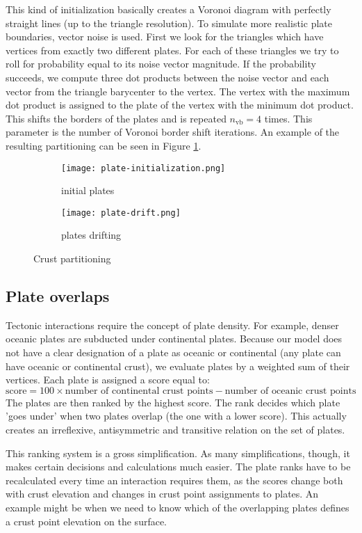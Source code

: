 This kind of initialization basically creates a Voronoi diagram with perfectly straight lines (up to the triangle resolution). To simulate more realistic plate boundaries, vector noise is used. First we look for the triangles which have vertices from exactly two different plates. For each of these triangles we try to roll for probability equal to its noise vector magnitude. If the probability succeeds, we compute three dot products between the noise vector and each vector from the triangle barycenter to the vertex. The vertex with the maximum dot product is assigned to the plate of the vertex with the minimum dot product. This shifts the borders of the plates and is repeated $n_{\mbox{vb}}=4$ times. This parameter is the number of Voronoi border shift iterations. An example of the resulting partitioning can be seen in Figure \ref{fig:initial-plates}.
\begin{figure}[ht]
\centering
\begin{subfigure}{7cm}
\texttt{[image: plate-initialization.png]}
\caption{initial plates}
\label{fig:initial-plates}
\end{subfigure}
\hspace*{1cm}
\begin{subfigure}{7cm}
\texttt{[image: plate-drift.png]}
\caption{plates drifting}
\label{fig:plates-drifting}
\end{subfigure}
\caption{Crust partitioning}
\label{fig:crust-partitioning}
\end{figure}
\subsection{Plate overlaps}
Tectonic interactions require the concept of plate density. For example, denser oceanic plates are subducted under continental plates. Because our model does not have a clear designation of a plate as oceanic or continental (any plate can have oceanic or continental crust), we evaluate plates by a weighted sum of their vertices. Each plate is assigned a score equal to:
$$\mbox{score}=100\times\mbox{number of continental crust points}-\mbox{number of oceanic crust points}$$
The plates are then ranked by the highest score. The rank decides which plate 'goes under' when two plates overlap (the one with a lower score). This actually creates an irreflexive, antisymmetric and transitive relation on the set of plates.

This ranking system is a gross simplification. As many simplifications, though, it makes certain decisions and calculations much easier. The plate ranks have to be recalculated every time an interaction requires them, as the scores change both with crust elevation and changes in crust point assignments to plates. An example might be when we need to know which of the overlapping plates defines a crust point elevation on the surface.

